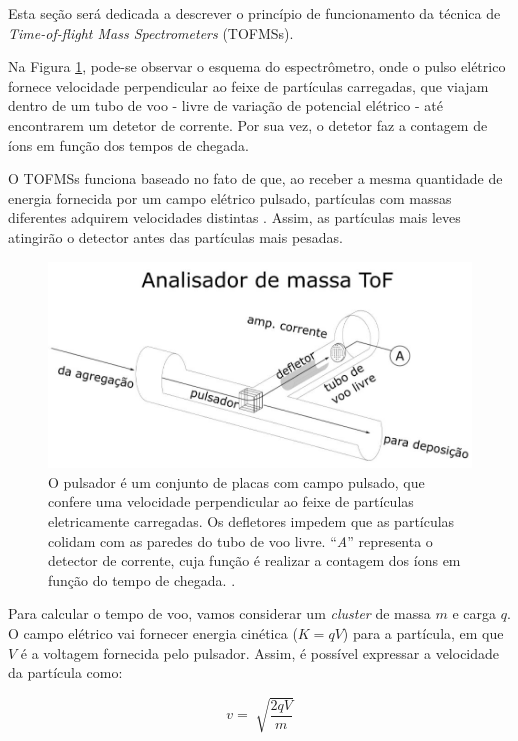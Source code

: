 Esta seção será dedicada a descrever o princípio de funcionamento da técnica de \textit{Time-of-flight Mass Spectrometers} (TOFMSs).

Na Figura \ref{fig:tof}, pode-se observar o esquema do espectrômetro, onde o pulso elétrico fornece velocidade perpendicular ao feixe de partículas carregadas, que viajam dentro de um tubo de voo - livre de variação de potencial elétrico - até encontrarem um detetor de corrente. Por sua vez, o detetor faz a contagem de íons em função dos tempos de chegada.

O TOFMSs funciona  baseado no fato de que, ao receber a mesma quantidade de energia fornecida por um campo elétrico pulsado, partículas com massas diferentes adquirem velocidades distintas \cite{dissertacao_kevin}. Assim, as partículas mais leves atingirão o detector antes das partículas mais pesadas.

\begin{figure}
  \centering
  \includegraphics[width=1\textwidth]{images/foca/tof}
  \caption{ O pulsador é um conjunto de placas com campo pulsado, que confere uma velocidade perpendicular ao feixe de partículas eletricamente carregadas. Os defletores impedem que as partículas colidam com as paredes do tubo de voo livre. ``\textit{A}'' representa o detector de corrente, cuja função é realizar a contagem dos íons em função do tempo de chegada.  \cite{dissertacao_kevin}.  }
  \label{fig:tof}
\end{figure}

Para calcular o tempo de voo, vamos considerar um \textit{cluster} de massa $m$ e carga $q$. O campo elétrico vai fornecer energia cinética ($K = qV$) para a partícula, em que $V$ é a voltagem fornecida pelo pulsador. Assim, é possível expressar a velocidade da partícula como:

\begin{equation}
v = \sqrt[]{\frac{2qV}{m}}
\end{equation}


